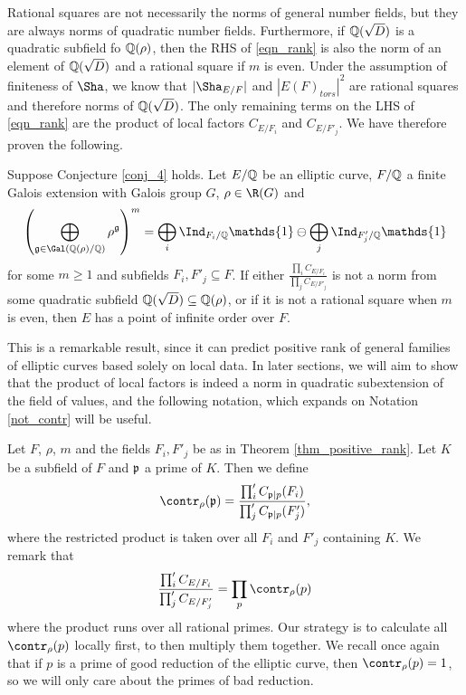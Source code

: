 Rational squares are not necessarily the norms of general number fields, but they are always norms of quadratic number fields. Furthermore, if $\mathbb{Q}(\sqrt{D})$ is a quadratic subfield fo $\mathbb{Q}(\rho)$, then the RHS of \eqref{eqn_rank} is also the norm of an element of $\mathbb{Q}(\sqrt{D})$ and a rational square if $m$ is even. Under the assumption of finiteness of $\Sha$, we know that $|\Sha_{E/F}|$ and $|E(F)_{tors}|^2$ are rational squares and therefore norms of $\mathbb{Q}(\sqrt{D})$. The only remaining terms on the LHS of \eqref{eqn_rank} are the product of local factors $C_{E/F_i}$ and $C_{E/F'_j}$. We have therefore proven the following.

\begin{thm}\cite[Theorem 33]{DEW1} \label{thm_positive_rank}
    Suppose Conjecture \ref*{conj_4} holds. Let $E/\mathbb{Q}$ be an elliptic curve, $F/\mathbb{Q}$ a finite Galois extension with Galois group $G$, $\rho \in \R(G)$ and  
    $$\left(\bigoplus_{\mathfrak{g}\in\Gal(\QQ(\rho)/\QQ)}\rho^{\mathfrak{g}}\right)^m=\bigoplus_i\Ind_{F_i/\QQ}\mathds{1}\ominus\bigoplus_j\Ind_{F'_j/\QQ}\mathds{1}$$
    for some $m\geq 1$ and subfields $F_i,F'_j\subseteq F$. If either $\frac{\prod_i C_{E/F_i}}{\prod_j C_{E/F'_j}}$ is not a norm from some quadratic subfield $\mathbb{Q}(\sqrt{D})\subseteq\mathbb{Q}(\rho)$, or if it is not a rational square when $m$ is even, then $E$ has a point of infinite order over $F$.
\end{thm}

This is a remarkable result, since it can predict positive rank of general families of elliptic curves based solely on local data. In later sections, we will aim to show that the product of local factors is indeed a norm in quadratic subextension of the field of values, and the following notation, which expands on Notation \ref*{not_contr} will be useful.

\begin{notation} \label{not_total_contr}
    Let $F$, $\rho$, $m$ and the fields $F_i,F'_j$ be as in Theorem \ref*{thm_positive_rank}. Let $K$ be a subfield of $F$ and $\mathfrak{p}$ a prime of $K$. Then we define
    $$\contr_\rho(\pp)=\frac{\prod'_i C_{\pp\mid p}(F_i)}{\prod'_j C_{\pp\mid p}(F'_j)},$$
    where the restricted product is taken over all $F_i$ and $F'_j$ containing $K$.
    We remark that 
    $$\frac{\prod'_i C_{E/F_i}}{\prod'_j C_{E/F'_j}}=\prod_p\contr_\rho(p)$$
    where the product runs over all rational primes. Our strategy is to calculate all $\contr_\rho(p)$ locally first, to then multiply them together. We recall once again that if $p$ is a prime of good reduction of the elliptic curve, then $\contr_\rho(p)=1$, so we will only care about the primes of bad reduction.
\end{notation}

